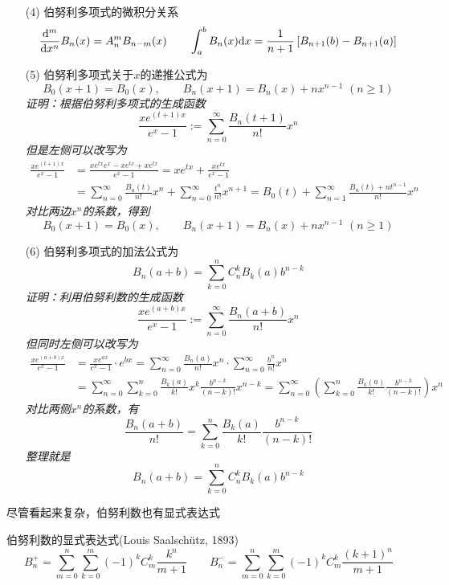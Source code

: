 \documentclass[main.tex]{subfiles}
\begin{document}
\begin{itemize}
    \item[(4)] 伯努利多项式的微积分关系
    \[\frac{{\rm d}^m}{{\rm d}x^n}B_n(x) = A_n^mB_{n-m}(x) \qquad \int_{a}^{b}B_n(x){\rm d}x = \frac{1}{n+1}\left[B_{n+1}(b)-B_{n+1}(a)\right]\] 
    \item[(5)] 伯努利多项式关于\(x\)的递推公式为
    \[B_0(x+1) = B_0(x), \qquad B_n(x+1) = B_n(x) + nx^{n-1}\,\, (n \geq 1)\] 
    \textit{
        证明：根据伯努利多项式的生成函数
        \[\frac{xe^{(t+1)x}}{e^{x}-1} := \sum_{n=0}^{\infty}\frac{B_n(t+1)}{n!}x^n\]
        但是左侧可以改写为
        \begin{align*}
            \frac{xe^{(t+1)x}}{e^{x}-1} 
            &= \frac{xe^{tx}e^x -xe^{tx} + xe^{tx}}{e^{x}-1} 
            = xe^{tx} + \frac{xe^{tx}}{e^{x}-1} \\
            &= \sum_{n=0}^{\infty}\frac{B_n(t)}{n!}x^n + \sum_{n=0}^{\infty}\frac{t^n}{n!}x^{n+1} 
            = B_0(t) + \sum_{n=1}^{\infty}\frac{B_n(t) + nt^{n-1}}{n!}x^n
        \end{align*}
        对比两边\(x^n\)的系数，得到
        \[B_0(x+1) = B_0(x), \qquad B_n(x+1) = B_n(x) + nx^{n-1}\,\, (n \geq 1)\]
    }
    \item[(6)] 伯努利多项式的加法公式为
    \[B_n(a+b) = \sum_{k=0}^{n}C_n^kB_k(a)b^{n-k}\]
    \textit{
        证明：利用伯努利数的生成函数
        \[\frac{xe^{(a+b)x}}{e^{x}-1} := \sum_{n=0}^{\infty}\frac{B_n(a+b)}{n!}x^n\]
        但同时左侧可以改写为
        \begin{align*}
            \frac{xe^{(a+b)x}}{e^{x}-1} 
            &= \frac{xe^{ax}}{e^{x}-1} \cdot e^{bx}
            = \sum_{n=0}^{\infty}\frac{B_n(a)}{n!}x^n \cdot \sum_{n=0}^{\infty}\frac{b^n}{n!}x^{n} \\
            &= \sum_{n=0}^{\infty} \sum_{k=0}^{n} \frac{B_k(a)}{k!}x^k\frac{b^{n-k}}{(n-k)!}x^{n-k}
            = \sum_{n=0}^{\infty} \left(\sum_{k=0}^{n} \frac{B_k(a)}{k!}\frac{b^{n-k}}{(n-k)!}\right) x^n 
        \end{align*}
        对比两侧\(x^n\)的系数，有
        \[\frac{B_n(a+b)}{n!} = \sum_{k=0}^{n} \frac{B_k(a)}{k!}\frac{b^{n-k}}{(n-k)!}\]
        整理就是
        \[B_n(a+b) = \sum_{k=0}^{n}C_n^kB_k(a)b^{n-k}\]
    }
\end{itemize}

尽管看起来复杂，伯努利数也有显式表达式
\begin{proposition}{伯努利数的显式表达式(Louis Saalschütz, 1893)}
    \[ B_n^+ = \sum_{m=0}^{n}\sum_{k=0}^{m}(-1)^kC_m^k\frac{k^n}{m+1} \qquad B_n^- = \sum_{m=0}^{n}\sum_{k=0}^{m}(-1)^kC_m^k\frac{(k+1)^n}{m+1}\]
\end{proposition}
\end{document}
